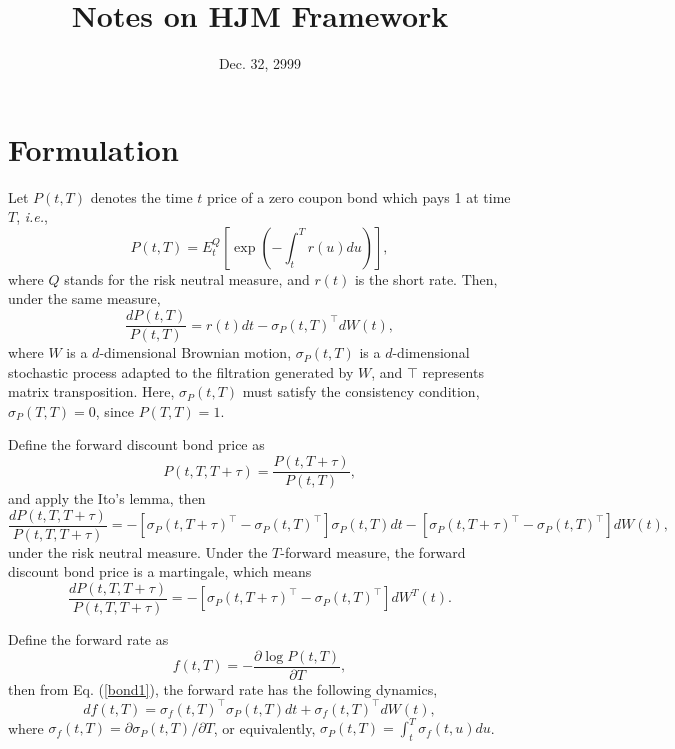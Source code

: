 \documentclass[12pt]{article}
\begin{document}
\title{Notes on HJM Framework}
\date{Dec. 32, 2999}

\maketitle

\section{Formulation}

  Let $P(t,T)$ denotes the time $t$ price of a zero coupon bond which pays 1 at time $T$, {\it i.e.},
  \begin{equation}
    P(t,T)=E_t^Q\left[\exp\left(-\int_t^T r(u)du\right)\right],
  \end{equation}
  where $Q$ stands for the risk neutral measure, and $r(t)$ is the short rate. Then, under the same measure,
  \begin{equation}
    \label{bond1}
    \frac{dP(t,T)}{P(t,T)}=r(t)dt-\sigma_P(t,T)^{{\top}}dW(t),
  \end{equation}
  where $W$ is a $d$-dimensional Brownian motion, $\sigma_P(t,T)$ is a
  $d$-dimensional stochastic process adapted to the filtration generated by $W$,
  and $\top$ represents matrix transposition. Here, $\sigma_P(t,T)$ must
  satisfy the consistency condition, $\sigma_P(T,T)=0$, since $P(T,T)=1$.

  Define the forward discount bond price as
  \begin{equation}
    P(t,T,T+\tau)=\frac{P(t,T+\tau)}{P(t,T)},
  \end{equation}
  and apply the Ito's lemma, then
  \begin{equation}
    \label{bond2}
    \frac{dP(t,T,T+\tau)}{P(t,T,T+\tau)}=-\left[\sigma_P(t,T+\tau)^{\top}-\sigma_P(t,T)^{\top}\right]\sigma_P(t,T)dt
                                        -\left[\sigma_P(t,T+\tau)^{\top}-\sigma_P(t,T)^{\top}\right]dW(t),
  \end{equation}
  under the risk neutral measure. Under the $T$-forward measure, the forward discount bond price is a martingale,
  which means
  \begin{equation}
    \label{bond3}
    \frac{dP(t,T,T+\tau)}{P(t,T,T+\tau)}=-\left[\sigma_P(t,T+\tau)^{\top}-\sigma_P(t,T)^{\top}\right]dW^T(t).
  \end{equation}

  Define the forward rate as
  \begin{equation}
    f(t,T)=-\frac{\partial\log P(t,T)}{\partial T},
  \end{equation}
  then from Eq. (\ref{bond1}), the forward rate has the following dynamics,
  \begin{equation}
    \label{rate}
    df(t,T)=\sigma_f(t,T)^{\top}\sigma_P(t,T)dt+\sigma_f(t,T)^{\top}dW(t),
  \end{equation}
  where $\sigma_f(t,T)=\partial\sigma_P(t,T)/\partial T$, or equivalently,
  $\sigma_P(t,T)=\int_t^T\sigma_f(t,u)du$.
\end{document}
